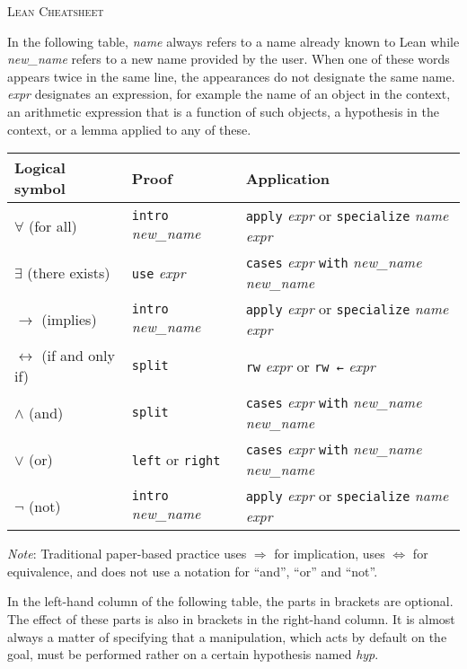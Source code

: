 \documentclass[a4paper]{article}
\newcommand{\lean}[1]{{\tt #1}}
\newcommand{\nv}{\textit{new\_name} }
\newcommand{\nom}{\textit{name} }
\newcommand{\expr}{\textit{expr} }
\newcommand{\hyp}{\textit{hyp}\xspace}
\begin{document}
\pagestyle{empty}
\begin{center}
 \large\textsc{Lean Cheatsheet}
\end{center}

In the following table,
\nom always refers to a name already known to Lean
while \nv refers to a new name provided by the user.
When one of these words appears twice in the same line,
the appearances do not designate the same name.
\expr designates an expression,
for example the name of an object in the context,
an arithmetic expression that is a function of such objects,
a hypothesis in the context,
or a lemma applied to any of these.

\begin{center}
\setlength\tabcolsep{1.6cm}
\def\arraystretch{1.5}
\begin{tabular}{@{}lll@{}}
  \toprule
  Logical symbol & Proof & Application \\
  \midrule
 $\forall$ (for all) & \lean{intro} \nv & \lean{apply} \expr or \lean{specialize} \nom \expr  \\
 $\exists$ (there exists) & \lean{use} \expr & \lean{cases} \expr \lean{with} \nv \nv \\
 $\to$ (implies) & \lean{intro} \nv & \lean{apply} \expr or \lean{specialize} \nom \expr \\
 $\leftrightarrow$ (if and only if) & \lean{split}  & \lean{rw} \expr or \lean{rw ←} \expr\\
 $\land$ (and) & \lean{split} & \lean{cases} \expr \lean{with} \nv \nv \\
 $\lor$ (or) & \lean{left} or \lean{right} & \lean{cases} \expr \lean{with} \nv \nv \\
 $\lnot$ (not) & \lean{intro} \nv & \lean{apply} \expr or \lean{specialize} \nom \expr  \\
  \bottomrule
\end{tabular}
\end{center}

\noindent
\emph{Note}:
Traditional paper-based practice uses $\Rightarrow$ for implication,
uses $\iff$ for equivalence,
and does not use a notation for ``and'', ``or'' and ``not''.

\medskip
\noindent
In the left-hand column of the following table,
the parts in brackets are optional.
The effect of these parts is also in brackets in the right-hand column.
It is almost always a matter of specifying that a manipulation,
which acts by default on the goal,
must be performed rather on a certain hypothesis named \hyp.
\end{document}
